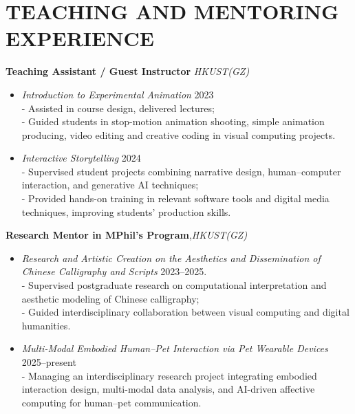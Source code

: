 
\section*{TEACHING AND MENTORING EXPERIENCE}
\noindent \textbf{Teaching Assistant / Guest Instructor} \hfill \textit{HKUST(GZ)}
\begin{itemize}[leftmargin=*]
  \item \textit{Introduction to Experimental Animation} \hfill 2023\\
  - Assisted in course design, delivered lectures;\\
  - Guided students in stop-motion animation shooting, simple animation producing, video editing and creative coding in visual computing projects.
  \item \textit{Interactive Storytelling} \hfill 2024\\
  - Supervised student projects combining narrative design, human–computer interaction, and generative AI techniques;\\
  - Provided hands-on training in relevant software tools and digital media techniques, improving students’ production skills.
\end{itemize}

\noindent \textbf{Research Mentor in MPhil’s Program},\hfill \textit{HKUST(GZ)}
\begin{itemize}[leftmargin=*]
  \item \textit{Research and Artistic Creation on the Aesthetics and Dissemination of Chinese Calligraphy and Scripts} \hfill 2023--2025.\\
  - Supervised postgraduate research on computational interpretation and aesthetic modeling of Chinese calligraphy;\\
  - Guided interdisciplinary collaboration between visual computing and digital humanities.
  \item \textit{Multi-Modal Embodied Human--Pet Interaction via Pet Wearable Devices} \hfill 2025--present\\
  - Managing an interdisciplinary research project integrating embodied interaction design, multi-modal data analysis, and AI-driven affective computing for human--pet communication.
\end{itemize}
